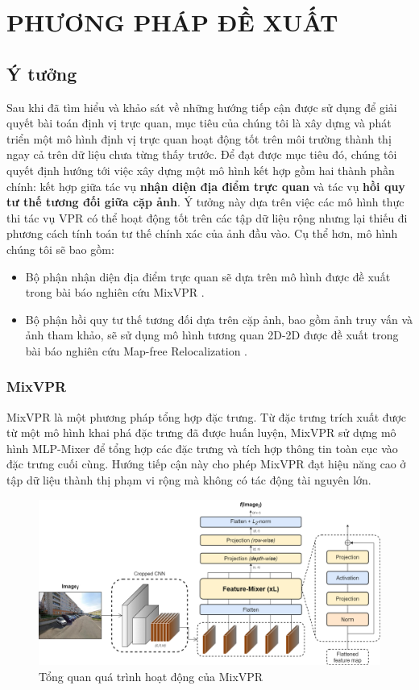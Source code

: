 \chapter{PHƯƠNG PHÁP ĐỀ XUẤT}

\section{Ý tưởng}
Sau khi đã tìm hiểu và khảo sát về những hướng tiếp cận được sử dụng để giải quyết bài toán định vị trực quan, mục tiêu của chúng tôi là xây dựng và phát triển một mô hình định vị trực quan hoạt động tốt trên môi trường thành thị ngay cả trên dữ liệu chưa từng thấy trước. Để đạt được mục tiêu đó, chúng tôi quyết định hướng tới việc xây dựng một mô hình kết hợp gồm hai thành phần chính: kết hợp giữa tác vụ \textbf{nhận diện địa điểm trực quan} và tác vụ \textbf{hồi quy tư thế tương đối giữa cặp ảnh}. Ý tưởng này dựa trên việc các mô hình thực thi tác vụ VPR có thể hoạt động tốt trên các tập dữ liệu rộng nhưng lại thiếu đi phương cách tính toán tư thế chính xác của ảnh đầu vào. Cụ thể hơn, mô hình chúng tôi sẽ bao gồm:
\begin{itemize}
  \item Bộ phận nhận diện địa điểm trực quan sẽ dựa trên mô hình được đề xuất trong bài báo nghiên cứu MixVPR \cite{alibey2023mixvpr}.
  \item Bộ phận hồi quy tư thế tương đối dựa trên cặp ảnh, bao gồm ảnh truy vấn và ảnh tham khảo, sẽ sử dụng mô hình tương quan 2D-2D được đề xuất trong bài báo nghiên cứu Map-free Relocalization \cite{arnold2022mapfree}.
\end{itemize}

\subsection{MixVPR \cite{alibey2023mixvpr}}

MixVPR \cite{alibey2023mixvpr} là một phương pháp tổng hợp đặc trưng. Từ đặc trưng trích xuất được từ một mô hình khai phá đặc trưng đã được huấn luyện, MixVPR sử dựng mô hình MLP-Mixer \cite{tolstikhin2021mlpmixer} để tổng hợp các đặc trưng và tích hợp thông tin toàn cục vào đặc trưng cuối cùng. Hướng tiếp cận này cho phép MixVPR đạt hiệu năng cao ở tập dữ liệu thành thị phạm vi rộng mà không có tác động tài nguyên lớn.

\begin{figure}[H]
  \centering
  \includegraphics[width=\textwidth]{pics/Proposal/mixvpr.png}
  \caption{Tổng quan quá trình hoạt động của MixVPR \cite{alibey2023mixvpr}}
\end{figure}

